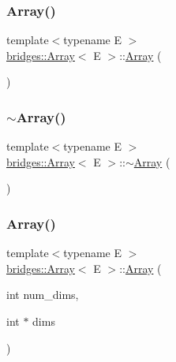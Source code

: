 \subsubsection{\texorpdfstring{Array()}{Array()}\hspace{0.1cm}{\footnotesize\ttfamily [1/5]}}
{\footnotesize\ttfamily template$<$typename E $>$ \\
\mbox{\hyperlink{classbridges_1_1_array}{bridges\+::\+Array}}$<$ E $>$\+::\mbox{\hyperlink{classbridges_1_1_array}{Array}} (\begin{DoxyParamCaption}{ }\end{DoxyParamCaption})\hspace{0.3cm}{\ttfamily [inline]}}

\mbox{\label{classbridges_1_1_array_abfca49c36c2b6c63c88010df50f5f49c}} 
\subsubsection{\texorpdfstring{$\sim$\+Array()}{~Array()}}
{\footnotesize\ttfamily template$<$typename E $>$ \\
\mbox{\hyperlink{classbridges_1_1_array}{bridges\+::\+Array}}$<$ E $>$\+::$\sim$\mbox{\hyperlink{classbridges_1_1_array}{Array}} (\begin{DoxyParamCaption}{ }\end{DoxyParamCaption})\hspace{0.3cm}{\ttfamily [inline]}}

\mbox{\label{classbridges_1_1_array_a25ff771f9ba7f365465f309ed2dd3688}} 
\subsubsection{\texorpdfstring{Array()}{Array()}\hspace{0.1cm}{\footnotesize\ttfamily [2/5]}}
{\footnotesize\ttfamily template$<$typename E $>$ \\
\mbox{\hyperlink{classbridges_1_1_array}{bridges\+::\+Array}}$<$ E $>$\+::\mbox{\hyperlink{classbridges_1_1_array}{Array}} (\begin{DoxyParamCaption}\item[{int}]{num\+\_\+dims,  }\item[{int $\ast$}]{dims }\end{DoxyParamCaption})\hspace{0.3cm}{\ttfamily [inline]}}

